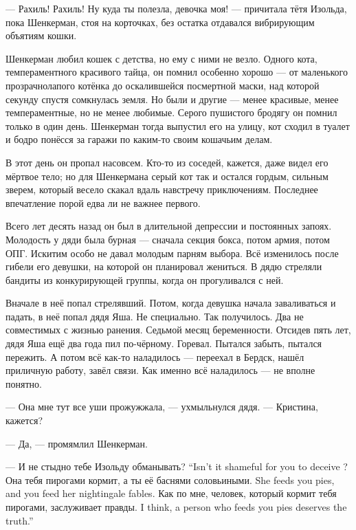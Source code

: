 --- Рахиль!
Рахиль!
Ну куда ты полезла, девочка моя! --- причитала тётя Изольда, пока Шенкерман, стоя на корточках, без остатка отдавался вибрирующим объятиям кошки.

Шенкерман любил кошек с детства, но ему с ними не везло.
Одного кота, темпераментного красивого тайца, он помнил особенно хорошо --- от маленького прозрачнолапого котёнка до оскалившейся посмертной маски, над которой секунду спустя сомкнулась земля.
Но были и другие --- менее красивые, менее темпераментные, но не менее любимые.
Серого пушистого бродягу он помнил только в один день.
Шенкерман тогда выпустил его на улицу, кот сходил в туалет и бодро понёсся за гаражи по каким-то своим кошачьим делам.

В этот день он пропал насовсем.
Кто-то из соседей, кажется, даже видел его мёртвое тело;
но для Шенкермана серый кот так и остался гордым, сильным зверем, который весело скакал вдаль навстречу приключениям.
Последнее впечатление порой едва ли не важнее первого.

\asterism

Всего лет десять назад он был в длительной депрессии и постоянных запоях.
Молодость у дяди была бурная --- сначала секция бокса, потом армия, потом ОПГ.
Искитим особо не давал молодым парням выбора.
Всё изменилось после гибели его девушки, на которой он планировал жениться.
В дядю стреляли бандиты из конкурирующей группы, когда он прогуливался с ней.

Вначале в неё попал стрелявший.
Потом, когда девушка начала заваливаться и падать, в неё попал дядя Яша.
Не специально.
Так получилось.
Два не совместимых с жизнью ранения.
Седьмой месяц беременности.
Отсидев пять лет, дядя Яша ещё два года пил по-чёрному.
Горевал.
Пытался забыть, пытался пережить.
А потом всё как-то наладилось --- переехал в Бердск, нашёл приличную работу, завёл связи.
Как именно всё наладилось --- не вполне понятно.

\asterism

--- Она мне тут все уши прожужжала, --- ухмыльнулся дядя.
--- Кристина, кажется?

--- Да, --- промямлил Шенкерман.

{--- И не стыдно тебе Изольду обманывать?}
{``Isn't it shameful for you to deceive \Izolda?}
{Она тебя пирогами кормит, а ты её баснями соловьиными.}
{She feeds you pies, and you feed her nightingale fables.}
{Как по мне, человек, который кормит тебя пирогами, заслуживает правды.}
{I think, a person who feeds you pies deserves the truth.''}

